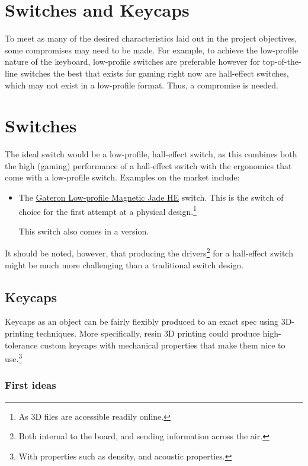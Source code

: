 \documentclass[11pt,a4paper]{article}
\numberwithin{equation}{section}
\begin{document}
\section{Switches and Keycaps}

To meet as many of the desired characteristics laid out in the project objectives, some compromises may need to be made. For example, to achieve the low-profile nature of the keyboard, low-profile switches are preferable however for top-of-the-line switches the best that exists for gaming right now are hall-effect switches, which may not exist in a low-profile format. Thus, a compromise is needed.

\section{Switches}

The ideal switch would be a low-profile, hall-effect switch, as this combines both the high (gaming) performance of a hall-effect switch with the ergonomics that come with a low-profile switch. Examples on the market include:
\begin{itemize}
    \item The \href{https://www.gateron.com/products/gateron-low-profile-magnetic-jade-switch?VariantsId=10872}{Gateron Low-profile Magnetic Jade HE} switch. This is the switch of choice for the first attempt at a physical design.\footnote{As 3D files are accessible readily online.}
    
    This switch also comes in a  version.
\end{itemize}
It should be noted, however, that producing the drivers\footnote{Both internal to the board, and sending information across the air.} for a hall-effect switch might be much more challenging than a traditional switch design.

\subsection{Keycaps}

Keycaps as an object can be fairly flexibly produced to an exact spec using 3D-printing techniques. More specifically, resin 3D printing could produce high-tolerance custom keycaps with mechanical properties that make them  nice to use.\footnote{With properties such as density, and acoustic properties.}

\subsubsection{First ideas}
\end{document}
